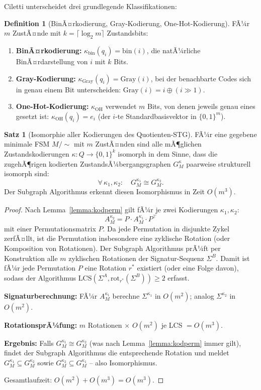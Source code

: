 ﻿\documentclass[a4paper,12pt]{article}
\theoremstyle{definition}
\newtheorem{definition}{Definition}
\newtheorem{satz}{Satz}
\begin{document}
Ciletti \cite[S.~96--100]{ciletti2011} unterscheidet drei grundlegende Klassifikationen:

\begin{definition}[BinÃ¤rkodierung, Gray-Kodierung, One-Hot-Kodierung]
  FÃ¼r $m$ ZustÃ¤nde mit $k = \lceil \log_2 m \rceil$ Zustandsbits:
  \begin{enumerate}
    \item \textbf{BinÃ¤rkodierung:} $\kappa_{\text{bin}}(q_i) = \text{bin}(i)$, die
          natÃ¼rliche BinÃ¤rdarstellung von $i$ mit $k$ Bits.
    \item \textbf{Gray-Kodierung:} $\kappa_{\text{Gray}}(q_i) = \text{Gray}(i)$,
          bei der benachbarte Codes sich in genau einem Bit unterscheiden:
          $\text{Gray}(i) = i \oplus (i \gg 1)$.
    \item \textbf{One-Hot-Kodierung:} $\kappa_{\text{OH}}$ verwendet $m$ Bits, von
          denen jeweils genau eines gesetzt ist: $\kappa_{\text{OH}}(q_i) = e_i$
          (der $i$-te Standardbasisvektor in $\{0,1\}^m$).
  \end{enumerate}
\end{definition}

\begin{satz}[Isomorphie aller Kodierungen des Quotienten-STG]\label{satz:iso_kodierungen}
  FÃ¼r eine gegebene minimale FSM $M/{\sim}$ mit $m$ ZustÃ¤nden sind alle mÃ¶glichen
  Zustandskodierungen $\kappa: Q \to \{0,1\}^k$ isomorph in dem Sinne, dass die
  zugehÃ¶rigen kodierten ZustandsÃ¼bergangsgraphen $G_M^{\kappa}$ paarweise strukturell
  isomorph sind:
  \[
    \forall\, \kappa_1, \kappa_2: \quad G_M^{\kappa_1} \cong G_M^{\kappa_2}.
  \]
  Der Subgraph Algorithmus erkennt diesen Isomorphismus in Zeit $O(m^3)$.
\end{satz}

\begin{proof}
  Nach Lemma~\ref{lemma:kodperm} gilt fÃ¼r je zwei Kodierungen $\kappa_1, \kappa_2$:
  \[
    A_M^{\kappa_2} = P \cdot A_M^{\kappa_1} \cdot P^\top
  \]
  mit einer Permutationsmatrix $P$. Da jede Permutation in disjunkte Zykel zerfÃ¤llt,
  ist die Permutation insbesondere eine zyklische Rotation (oder Komposition von
  Rotationen). Der Subgraph Algorithmus prÃ¼ft per Konstruktion alle $m$ zyklischen
  Rotationen der Signatur-Sequenz $\Sigma^B$. Damit ist fÃ¼r jede Permutation $P$
  eine Rotation $r^*$ existiert (oder eine Folge davon), sodass der Algorithmus
  $\text{LCS}(\Sigma^A, \text{rot}_{r^*}(\Sigma^B)) \geq 2$ erfasst.

  \textbf{Signaturberechnung:} FÃ¼r $A_M^{\kappa_1}$ berechne $\Sigma^{\kappa_1}$ in
  $O(m^2)$; analog $\Sigma^{\kappa_2}$ in $O(m^2)$.

  \textbf{RotationsprÃ¼fung:} $m$ Rotationen $\times$ $O(m^2)$ je LCS $= O(m^3)$.

  \textbf{Ergebnis:} Falls $G_M^{\kappa_1} \cong G_M^{\kappa_2}$ (was nach
  Lemma~\ref{lemma:kodperm} immer gilt), findet der Subgraph Algorithmus die
  entsprechende Rotation und meldet $G_M^{\kappa_1} \subseteq G_M^{\kappa_2}$ sowie
  $G_M^{\kappa_2} \subseteq G_M^{\kappa_1}$ -- also Isomorphismus.

  Gesamtlaufzeit: $O(m^2) + O(m^3) = O(m^3)$.
\end{proof}
\end{document}
